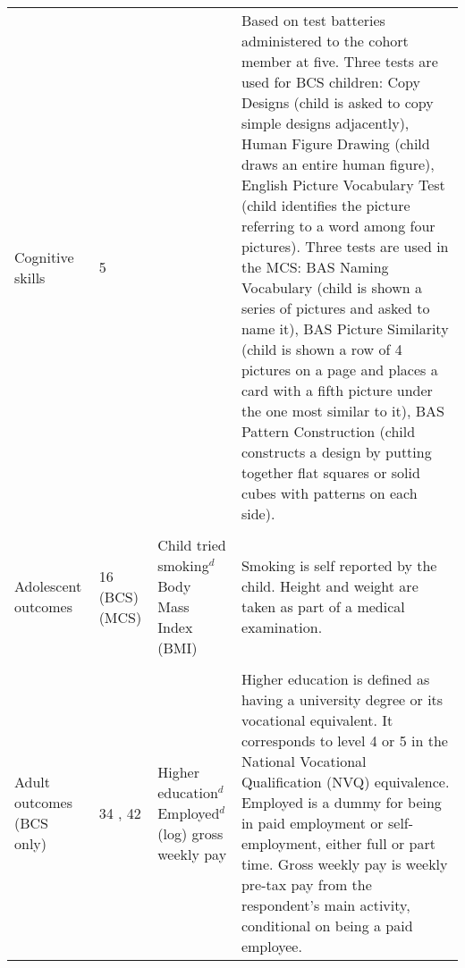 \begin{sidewaystable}[ht!]
\begin{tabular}{L{.15\textwidth}C{.08\textwidth}L{.22\textwidth}L{.55\textwidth}}
Cognitive skills & 5 & & Based on test batteries administered to the cohort member at five. Three tests are used for BCS children: Copy Designs (child is asked to copy simple designs adjacently), Human Figure Drawing (child draws an entire human figure), English Picture Vocabulary Test (child identifies the picture referring to a word among four pictures). Three tests are used in the MCS: BAS Naming Vocabulary (child is shown a series of pictures and asked to name it), BAS Picture Similarity (child is shown a row of 4 pictures on a page and places a card with a fifth picture under the one most similar to it), BAS Pattern Construction (child constructs a design by putting together flat squares or solid cubes with patterns on each side).
 \\ \\[-1.5em]
Adolescent outcomes & 16 (BCS)  (MCS) & Child tried smoking$^d$ \newline Body Mass Index (BMI) & Smoking is self reported by the child. Height and weight are taken as part of a medical examination. \\ \\[-1.5em]
Adult outcomes (BCS only) & 34  , 42 & Higher education$^d$ \newline Employed$^d$ \newline (log) gross weekly pay & Higher education is defined as having a university degree or its vocational equivalent. It corresponds to level 4 or 5 in the National Vocational Qualification (NVQ) equivalence. Employed is a dummy for being in paid employment or self-employment, either full or part time. Gross weekly pay is weekly pre-tax pay from the respondent's main activity, conditional on being a paid employee. \\
\bottomrule
\end{tabular}
\end{sidewaystable}


